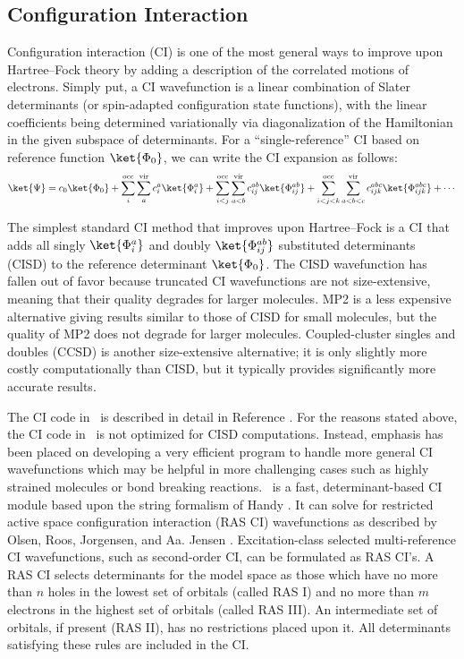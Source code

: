 \subsection{Configuration Interaction} \label{sec:detci}
\renewcommand{\optionname}[2]{\texttt{\nameref{op-#2-#1}}}

Configuration interaction (CI) is one of the most general ways to
improve upon Hartree--Fock theory by adding a description of the
correlated motions of electrons.  Simply put, a CI wavefunction
is a linear combination of Slater determinants (or spin-adapted
configuration state functions), with the linear coefficients being
determined variationally via diagonalization of the Hamiltonian in the
given subspace of determinants.  For a ``single-reference'' CI based 
on reference function $\ket{\Phi_0}$, we can write the CI expansion as
follows:
\begin{equation}
\label{eq:CIexpansion}
\ket{\Psi} = c_0 \ket{\Phi_0} 
 + \sum_i^{\rm occ} \sum_a^{\rm vir} c_i^a \ket{\Phi_i^a}
 + \sum_{i<j}^{\rm occ} \sum_{a<b}^{\rm vir} c_{ij}^{ab} \ket{\Phi_{ij}^{ab}}
 + \sum_{i<j<k}^{\rm occ} \sum_{a<b<c}^{\rm vir} c_{ijk}^{abc}
   \ket{\Phi_{ijk}^{abc}} 
 + \cdots
\end{equation}

The simplest standard CI method that improves upon Hartree--Fock is a CI
that adds all singly $\ket{\Phi_i^a}$ and doubly $\ket{\Phi_{ij}^{ab}}$
substituted determinants (CISD) to the reference determinant
$\ket{\Phi_0}$.  The CISD wavefunction has fallen out of favor
because truncated CI wavefunctions are not size-extensive, meaning
that their quality degrades for larger molecules.  MP2 is a less
expensive alternative giving results similar to those of CISD for small
molecules, but the quality of MP2 does not degrade for larger molecules.
Coupled-cluster singles and doubles (CCSD) is another size-extensive
alternative; it is only slightly more costly computationally than CISD,
but it typically provides significantly more accurate results.

The CI code in \PSIfour\ is described in detail in Reference
\cite{Sherrill:1999:CI}.  For the reasons stated above, the CI code in
\PSIfour\ is not optimized for CISD computations.  Instead, emphasis
has been placed on developing a very efficient program to handle more
general CI wavefunctions which may be helpful in more challenging cases
such as highly strained molecules or bond breaking reactions.  \PSIdetci\
is a fast, determinant-based CI module based upon the string formalism
of Handy \cite{Handy:1980}.  It can solve for restricted active space
configuration interaction (RAS CI) wavefunctions as described by Olsen,
Roos, Jorgensen, and Aa. Jensen \cite{Olsen:1988}.  Excitation-class
selected multi-reference CI wavefunctions, such as second-order CI,
can be formulated as RAS CI's.  A RAS CI selects determinants for the
model space as those which have no more than $n$ holes in the lowest set
of orbitals (called RAS I) and no more than $m$ electrons in the highest
set of orbitals (called RAS III).  An intermediate set of orbitals, if
present (RAS II), has no restrictions placed upon it.  All determinants
satisfying these rules are included in the CI.

